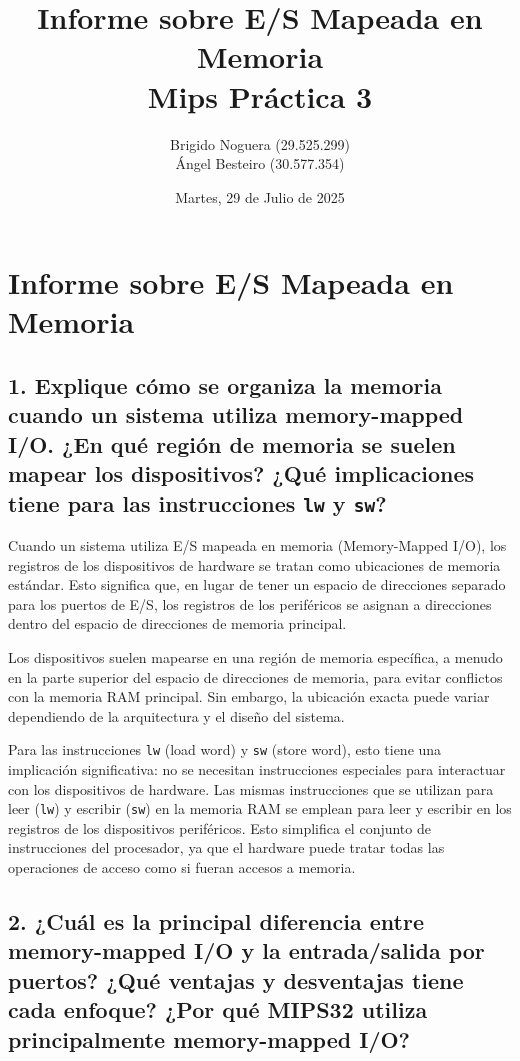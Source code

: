 \documentclass[12pt]{article}
\title{
    \textbf{Informe sobre E/S Mapeada en Memoria} \\
    \textbf{Mips Práctica 3}
}
\author{
    Brigido Noguera (29.525.299) \\
    Ángel Besteiro (30.577.354)
}
\date{Martes, 29 de Julio de 2025}
\begin{document}
\maketitle %

\clearpage %

\section*{Informe sobre E/S Mapeada en Memoria}

\subsection*{1. Explique cómo se organiza la memoria cuando un sistema utiliza memory-mapped I/O. ¿En qué región de memoria se suelen mapear los dispositivos? ¿Qué implicaciones tiene para las instrucciones \texttt{lw} y \texttt{sw}?}

Cuando un sistema utiliza E/S mapeada en memoria (Memory-Mapped I/O), los registros de los dispositivos de hardware se tratan como ubicaciones de memoria estándar. Esto significa que, en lugar de tener un espacio de direcciones separado para los puertos de E/S, los registros de los periféricos se asignan a direcciones dentro del espacio de direcciones de memoria principal.

Los dispositivos suelen mapearse en una región de memoria específica, a menudo en la parte superior del espacio de direcciones de memoria, para evitar conflictos con la memoria RAM principal. Sin embargo, la ubicación exacta puede variar dependiendo de la arquitectura y el diseño del sistema.

Para las instrucciones \texttt{lw} (load word) y \texttt{sw} (store word), esto tiene una implicación significativa: no se necesitan instrucciones especiales para interactuar con los dispositivos de hardware. Las mismas instrucciones que se utilizan para leer (\texttt{lw}) y escribir (\texttt{sw}) en la memoria RAM se emplean para leer y escribir en los registros de los dispositivos periféricos. Esto simplifica el conjunto de instrucciones del procesador, ya que el hardware puede tratar todas las operaciones de acceso como si fueran accesos a memoria.

\subsection*{2. ¿Cuál es la principal diferencia entre memory-mapped I/O y la entrada/salida por puertos? ¿Qué ventajas y desventajas tiene cada enfoque? ¿Por qué MIPS32 utiliza principalmente memory-mapped I/O?}
\end{document}
